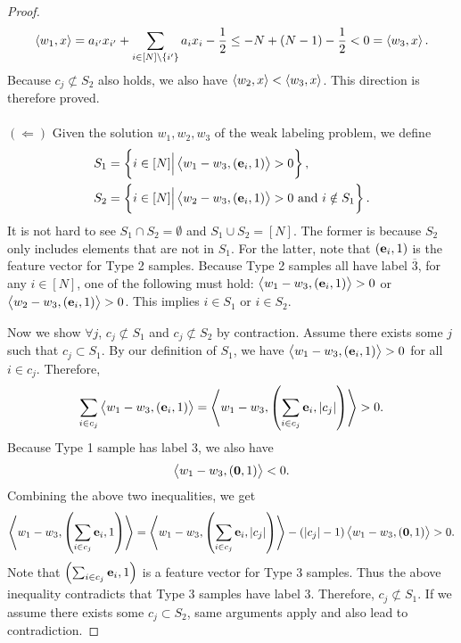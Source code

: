 \begin{proof}
 \begin{align*}
     \left\langle w_1, x \right\rangle= a_{i'}x_{i'} + \sum_{i\in [N]\backslash\{i'\}} a_ix_i - \frac{1}{2} \leq -N + (N-1)-\frac{1}{2} < 0 = \left\langle w_3, x \right\rangle.
 \end{align*}
 Because $c_j \not\subset S_2$ also holds, we also have $\left\langle w_2, x \right\rangle<\left\langle w_3, x \right\rangle$. This direction is therefore proved. \\
 \ \\
 $(\Longleftarrow)$ Given the solution $w_1, w_2, w_3$ of the weak labeling problem, we define
 \begin{align*}
     S_1 &= \left\{i\in [N] \Big| \left\langle w_1-w_3, (\mathbf{e}_i, 1) \right\rangle > 0 \right\}, \\
     S_2 &= \left\{i\in [N] \Big| \left\langle w_2-w_3, (\mathbf{e}_i, 1) \right\rangle > 0 \text{\ and\ } i\notin S_1 \right\}.
 \end{align*}
 It is not hard to see $S_1 \cap S_2 = \emptyset$ and $S_1\cup S_2 = [N]$. The former is because $S_2$ only includes elements that are not in $S_1$. For the latter, note that $(\mathbf{e}_i, 1)$ is the feature vector for Type 2 samples. Because Type 2 samples all have label $\overline{3}$, for any $i\in [N]$, one of the following must hold: $\left\langle w_1-w_3, (\mathbf{e}_i, 1) \right\rangle>0$ or $\left\langle w_2-w_3, (\mathbf{e}_i, 1) \right\rangle>0$. This implies $i\in S_1$ or $i\in S_2$.

 Now we show $\forall j$, $c_j \not\subset S_1$ and $c_j \not\subset S_2$ by contraction. Assume there exists some $j$ such that $c_j \subset S_1$. By our definition of $S_1$, we have $\left\langle w_1-w_3, (\mathbf{e}_i, 1) \right\rangle > 0$ for all $i\in c_j$. Therefore,
 \begin{align*}
     \sum_{i\in c_j}\left\langle w_1-w_3, \left(\mathbf{e}_i, 1\right) \right\rangle = \left\langle w_1-w_3, \left(\sum_{i\in c_j}\mathbf{e}_i, |c_j|\right) \right\rangle > 0.
 \end{align*}
 Because Type 1 sample has label $3$, we also have
 \begin{align*}
     \left\langle w_1-w_3, \left(\mathbf{0}, 1\right) \right\rangle < 0.
 \end{align*}
 Combining the above two inequalities, we get
 \begin{align*}
     \left\langle w_1-w_3, \left(\sum_{i\in c_j}\mathbf{e}_i, 1\right) \right\rangle = \left\langle w_1-w_3, \left(\sum_{i\in c_j}\mathbf{e}_i, |c_j|\right) \right\rangle - (|c_j|-1)\left\langle w_1-w_3, \left(\mathbf{0}, 1\right) \right\rangle>0.
 \end{align*}
 Note that $\left(\sum_{i\in c_j}\mathbf{e}_i, 1\right)$ is a feature vector for Type 3 samples. Thus the above inequality contradicts that Type 3 samples have label 3. Therefore, $c_j \not\subset S_1$. If we assume there exists some $c_j \subset S_2$, same arguments apply and also lead to contradiction.
\end{proof}
